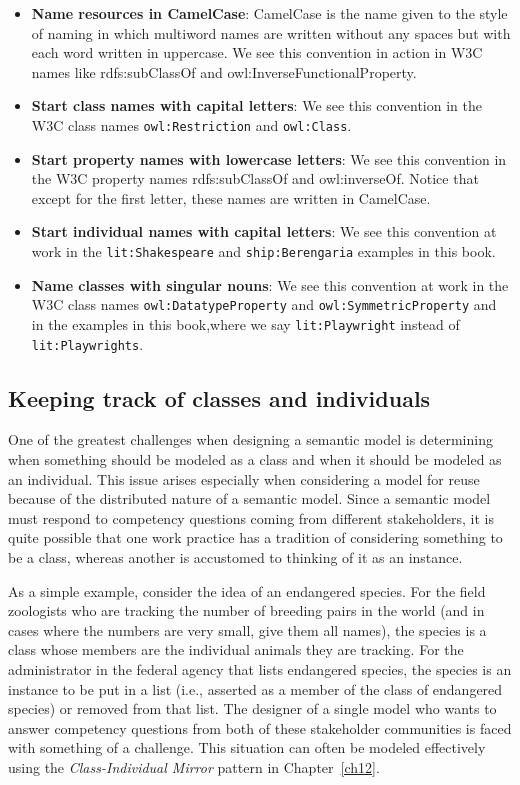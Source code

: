 \begin{itemize}
\item \textbf{Name resources in CamelCase}: CamelCase is the name given to the style of
naming in which multiword names are written without any spaces but with
each word written in uppercase. We see this convention in action in W3C
names like rdfs:subClassOf and owl:InverseFunctionalProperty.

\item \textbf{Start class names with capital letters}: We see this convention in the
W3C class names \texttt{owl:Restriction} and \texttt{owl:Class}.

\item \textbf{Start property names with lowercase letters}: We see this convention in
the W3C property names rdfs:subClassOf and owl:inverseOf. Notice that
except for the first letter, these names are written in CamelCase.

\item \textbf{Start individual names with capital letters}: We see this convention at
work in the
\texttt{lit:Shakespeare} and \texttt{ship:Berengaria} examples in this book.

\item \textbf{Name classes with singular nouns}: We see this convention at work in the W3C
class names \texttt{owl:DatatypeProperty} and \texttt{owl:SymmetricProperty} and in the
examples in this book,where we say  \texttt{lit:Playwright} instead of \texttt{lit:Playwrights}.
\end{itemize}


\subsection{Keeping track of classes and individuals}
\label{metamodel}
One of the greatest challenges when designing a semantic model is
determining when something should be modeled as a class and when it
should be modeled as an individual. This issue arises especially when
considering a model for reuse because of the distributed nature of a
semantic model. Since a semantic model must respond to competency
questions coming from different stakeholders, it is quite possible that
one work practice has a tradition of considering something to be a
class, whereas another is accustomed to thinking of it as an instance.

As a simple example, consider the idea of an endangered species. For the
field zoologists who are
tracking the number of breeding pairs in the world (and in cases where
the numbers are very small, give them all names), the species is a class
whose members are the individual animals they are tracking. For the
administrator in the federal agency that lists endangered species, the
species is an instance to be put in a list (i.e., asserted as a member
of the class of endangered species) or removed from that list. The
designer of a single model who wants to answer competency questions from
both of these stakeholder communities is faced with something of a
challenge. This situation can often be modeled effectively using the
\emph{Class-Individual Mirror} pattern in Chapter~\ref{ch12}.

